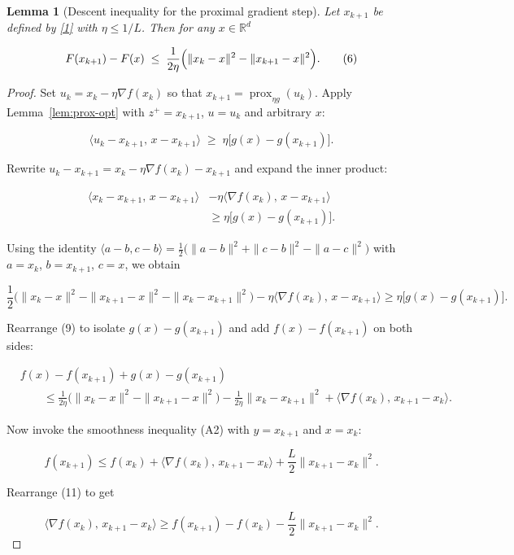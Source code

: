 \documentclass{article}
\newtheorem{lemma}{Lemma}
\newcommand{\prox}{\operatorname{prox}}
\newcommand{\grad}{\nabla}
\newcommand{\R}{\mathbb{R}}
\begin{document}
\begin{lemma}[Descent inequality for the proximal gradient step]\label{lem:descent}
Let $x_{k+1}$ be defined by \eqref{1} with $\eta\le 1/L$. Then for any $x\in\R^{d}$  

\[
F(x_{k+1})-F(x)
\;\le\;
\frac{1}{2\eta}\Bigl(\|x_{k}-x\|^{2}-\|x_{k+1}-x\|^{2}\Bigr).
\tag{6}
\]
\end{lemma}
\begin{proof}
Set $u_{k}=x_{k}-\eta\grad f(x_{k})$ so that $x_{k+1}= \prox_{\eta g}(u_{k})$.
Apply Lemma~\ref{lem:prox-opt} with $z^{+}=x_{k+1}$, $u=u_{k}$ and arbitrary $x$:

\[
\langle u_{k}-x_{k+1},\,x-x_{k+1}\rangle
\;\ge\;
\eta\bigl[g(x)-g(x_{k+1})\bigr].
\tag{7}
\]

Rewrite $u_{k}-x_{k+1}=x_{k}-\eta\grad f(x_{k})-x_{k+1}$ and expand the inner product:

\[
\begin{aligned}
\langle x_{k}-x_{k+1},\,x-x_{k+1}\rangle
&-\eta\langle\grad f(x_{k}),\,x-x_{k+1}\rangle\\
&\ge\eta\bigl[g(x)-g(x_{k+1})\bigr].
\end{aligned}
\tag{8}
\]

Using the identity $\langle a-b,c-b\rangle
=\frac{1}{2}\bigl(\|a-b\|^{2}+\|c-b\|^{2}-\|a-c\|^{2}\bigr)$ with
$a=x_{k}$, $b=x_{k+1}$, $c=x$, we obtain  

\[
\frac{1}{2}\bigl(\|x_{k}-x\|^{2}-\|x_{k+1}-x\|^{2}-\|x_{k}-x_{k+1}\|^{2}\bigr)
-\eta\langle\grad f(x_{k}),\,x-x_{k+1}\rangle
\ge\eta\bigl[g(x)-g(x_{k+1})\bigr].
\tag{9}
\]

Rearrange (9) to isolate $g(x)-g(x_{k+1})$ and add $f(x)-f(x_{k+1})$ on both sides:

\[
\begin{aligned}
&f(x)-f(x_{k+1})+g(x)-g(x_{k+1})\\
&\qquad\le
\frac{1}{2\eta}\bigl(\|x_{k}-x\|^{2}-\|x_{k+1}-x\|^{2}\bigr)
-\frac{1}{2\eta}\|x_{k}-x_{k+1}\|^{2}
+\langle\grad f(x_{k}),\,x_{k+1}-x_{k}\rangle .
\end{aligned}
\tag{10}
\]

Now invoke the smoothness inequality (A2) with $y=x_{k+1}$ and $x=x_{k}$:

\[
f(x_{k+1})\le f(x_{k})+\langle\grad f(x_{k}),\,x_{k+1}-x_{k}\rangle
+\frac{L}{2}\|x_{k+1}-x_{k}\|^{2}.
\tag{11}
\]

Rearrange (11) to get  

\[
\langle\grad f(x_{k}),\,x_{k+1}-x_{k}\rangle
\ge f(x_{k+1})-f(x_{k})-\frac{L}{2}\|x_{k+1}-x_{k}\|^{2}.
\tag{12}
\]


\end{proof}
\end{document}
